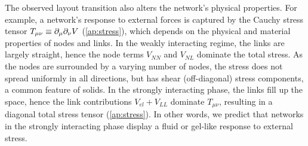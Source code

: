 \documentclass[endfloats,nofootinbib,preprint,floatfix,titlepage,superscriptaddress,linenumbers]{revtex4-1} %
\begin{document}
The observed layout transition also alters the  network's physical properties.
For example, a network's response to external forces is captured by the Cauchy stress tensor $T_{\mu\nu} \equiv \partial_\mu\partial_\nu V$ \cite{irgens2008continuum} (\ref{ap:stress}), which depends on the physical and material properties of nodes and links. 
In the weakly interacting regime, the links are largely straight, hence the node terms $V_{NN}$ and $V_{NL}$ dominate the total stress. 
As the nodes are surrounded by a varying number of nodes, the stress does not spread uniformly in all directions, but has shear (off-diagonal) stress components, a common feature of solids.
In the strongly interacting phase, the links fill up the space,
hence the link contributions $V_{el}+V_{LL}$  dominate $T_{\mu\nu}$, 
resulting in a diagonal total stress tensor (\ref{ap:stress}). 
In other words, we predict that networks in the strongly interacting phase display a fluid or gel-like response to external stress. 
\end{document}
